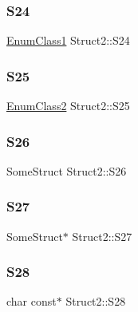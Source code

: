 \mbox{\label{structStruct2_afbace320147229ed3e2731608153c052}} 
\subsubsection{\texorpdfstring{S24}{S24}}
{\footnotesize\ttfamily \hyperlink{ParsedC_8h_a542930d5f2f117ff1e21206f2baa51c5}{Enum\+Class1} Struct2\+::\+S24}

\mbox{\label{structStruct2_abcb5fd48eb7982bb4f6814c36e0071ec}} 
\subsubsection{\texorpdfstring{S25}{S25}}
{\footnotesize\ttfamily \hyperlink{ParsedC_8h_a51df612b239afb50004d7a39b20a5745}{Enum\+Class2} Struct2\+::\+S25}

\mbox{\label{structStruct2_aa044d3679db18f7cb109c0e2b647e906}} 
\subsubsection{\texorpdfstring{S26}{S26}}
{\footnotesize\ttfamily Some\+Struct Struct2\+::\+S26}

\mbox{\label{structStruct2_a167bbe0c07423ac881f74ec233954dac}} 
\subsubsection{\texorpdfstring{S27}{S27}}
{\footnotesize\ttfamily Some\+Struct$\ast$ Struct2\+::\+S27}

\mbox{\label{structStruct2_a34ea25fad0eb64f1019b27878ec7a35a}} 
\subsubsection{\texorpdfstring{S28}{S28}}
{\footnotesize\ttfamily char const$\ast$ Struct2\+::\+S28}

